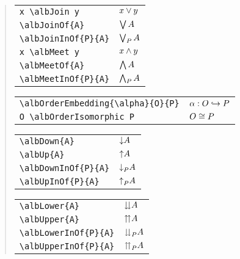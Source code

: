 \documentclass[11pt,a4paper,oneside]{alb-latex}
\begin{document}
\begin{quote}
  \begin{tabular}{p{}@{\qquad}p{}}
    \verb$x \albJoin y$ & $x \vee y$ \\
    \verb$\albJoinOf{A}$ & $\bigvee A$ \\
    \verb$\albJoinInOf{P}{A}$ & $\bigvee\nolimits_{P} A$ \\
    \verb$x \albMeet y$ & $x \wedge y$ \\
    \verb$\albMeetOf{A}$ & $\bigwedge A$ \\
    \verb$\albMeetInOf{P}{A}$ & $\bigwedge\nolimits_{P} A$
  \end{tabular}

  \begin{tabular}{p{}@{\qquad}p{}}
    \verb$\albOrderEmbedding{\alpha}{O}{P}$ &
    $\albOrderEmbedding{\alpha}{O}{P}$ \\
    \verb$O \albOrderIsomorphic P$ & $O \cong P$
  \end{tabular}

  \begin{tabular}{p{}@{\qquad}p{}}
    \verb$\albDown{A}$ & $\mathord{\downarrow}A$ \\
    \verb$\albUp{A}$ & $\mathord{\uparrow}A$ \\
    \verb$\albDownInOf{P}{A}$ & $\mathord{\downarrow}_{P}A$ \\
    \verb$\albUpInOf{P}{A}$ & $\mathord{\uparrow}_{P}A$
  \end{tabular}

  \begin{tabular}{p{}@{\qquad}p{}}
    \verb$\albLower{A}$ & $\mathord{\downdownarrows}A$ \\
    \verb$\albUpper{A}$ & $\mathord{\upuparrows}A$ \\
    \verb$\albLowerInOf{P}{A}$ & $\mathord{\downdownarrows}_{P}A$ \\
    \verb$\albUpperInOf{P}{A}$ & $\mathord{\upuparrows}_{P}A$
  \end{tabular}


\end{quote}
\end{document}
